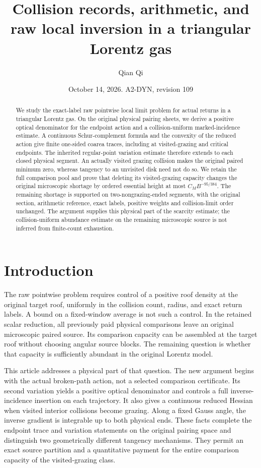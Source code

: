 \documentclass[11pt,reqno]{amsart}
\title[Collision records and raw local inversion]{Collision records, arithmetic, and raw local inversion in a triangular Lorentz gas}
\author{Qian Qi}
\date{October 14, 2026. A2-DYN, revision 109}
\numberwithin{equation}{section}
\theoremstyle{definition}\newtheorem{definition}[theorem]{Definition}
\theoremstyle{remark}\newtheorem{remark}[theorem]{Remark}
\begin{document}
\raggedbottom
\begin{abstract}
We study the exact-label raw pointwise local limit problem for
actual returns in a triangular Lorentz gas. On the original physical
pairing sheets, we derive a positive optical denominator for the
endpoint action and a collision-uniform marked-incidence estimate.
A continuous Schur-complement formula and the convexity of the
reduced action give finite one-sided coarea traces, including at
visited-grazing and critical endpoints. The inherited regular-point
variation estimate therefore extends to each closed physical segment.
An actually visited grazing collision makes the original paired
minimum zero, whereas tangency to an unvisited disk need not do so.
We retain the full comparison pool and prove that deleting its
visited-grazing capacity changes the original microscopic shortage
by ordered essential height at most $C_MB^{-95/384}$. The remaining
shortage is supported on two-nongrazing-ended segments, with the
original section, arithmetic reference, exact labels, positive
weights and collision-limit order unchanged. The argument supplies
this physical part of the scarcity estimate; the collision-uniform
abundance estimate on the remaining microscopic source is not
inferred from finite-count exhaustion.
\end{abstract}
\maketitle

\section*{Introduction}
The raw pointwise problem requires control of a positive roof density
at the original target roof, uniformly in the collision count, radius,
and exact return labels. A bound on a fixed-window average is not
such a control. In the retained scalar reduction, all previously paid
physical comparisons leave an original microscopic paired source.
Its comparison capacity can be assembled at the target roof without
choosing angular source blocks. The remaining question is whether
that capacity is sufficiently abundant in the original Lorentz model.

This article addresses a physical part of that question. The new
argument begins with the actual broken-path action, not a selected
comparison certificate. Its second variation yields a positive
optical denominator and controls a full inverse-incidence insertion
on each trajectory. It also gives a continuous reduced Hessian when
visited interior collisions become grazing. Along a fixed Gauss
angle, the inverse gradient is integrable up to both physical ends.
These facts complete the endpoint trace and variation statements on
the original pairing space and distinguish two geometrically different
tangency mechanisms. They permit an exact source partition and a
quantitative payment for the entire comparison capacity of the
visited-grazing class.
\end{document}
